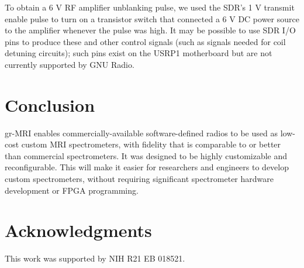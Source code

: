 \documentclass[10pt,letterpaper]{article}
\begin{document}
\par To obtain a 6 V RF amplifier unblanking pulse, 
we used the SDR's 1 V transmit enable pulse to turn on a transistor switch that connected a 6 V DC power source to the amplifier whenever the pulse was high.
It may be possible to use SDR I/O pins to produce these and other control signals (such as signals 
needed for coil detuning circuits); such pins exist on the USRP1 motherboard but 
are not currently supported by GNU Radio. 

\section*{Conclusion}
gr-MRI enables commercially-available software-defined radios
to be used as 
low-cost custom MRI spectrometers, with fidelity that is comparable to or better than
commercial spectrometers.
It was designed to be highly customizable and reconfigurable. 
This will make it easier for researchers and engineers to develop custom spectrometers, 
without requiring significant spectrometer hardware development
or FPGA programming.

\section*{Acknowledgments}

This work was supported by NIH R21 EB 018521.



{}

\end{document}
